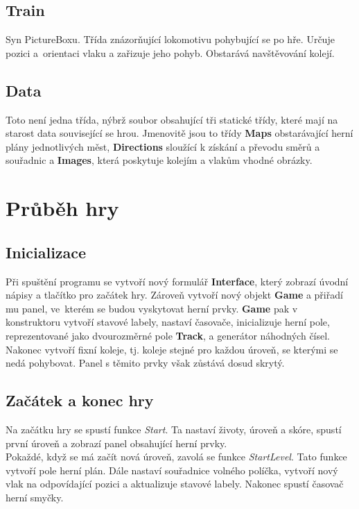 \documentclass[11pt,a4paper]{scrreprt}
\begin{document}
\section{Train}
Syn PictureBoxu. Třída znázorňující lokomotivu pohybující se po hře. Určuje pozici a~orientaci vlaku a zařizuje jeho pohyb. Obstarává navštěvování kolejí.

\section{Data}
Toto není jedna třída, nýbrž soubor obsahující tři statické třídy, které mají na starost data související se hrou. Jmenovitě jsou to třídy \textbf{Maps} obstarávající herní plány jednotlivých měst, \textbf{Directions} sloužící k získání a převodu směrů a souřadnic a \textbf{Images}, která poskytuje kolejím a vlakům vhodné obrázky.

\chapter{Průběh hry}

\section{Inicializace}
Při spuštění programu se vytvoří nový formulář \textbf{Interface}, který zobrazí úvodní nápisy a tlačítko pro začátek hry. Zároveň vytvoří nový objekt \textbf{Game} a přiřadí mu panel, ve~kterém se budou vyskytovat herní prvky. \textbf{Game} pak v konstruktoru vytvoří stavové labely, nastaví časovače, inicializuje herní pole, reprezentované jako dvourozměrné pole \textbf{Track}, a generátor náhodných čísel. Nakonec vytvoří fixní koleje, tj. koleje stejné pro každou úroveň, se kterými se nedá pohybovat. Panel s těmito prvky však zůstává dosud skrytý.

\section{Začátek a konec hry}
Na začátku hry se spustí funkce \textit{Start}. Ta nastaví životy, úroveň a skóre, spustí první úroveň a zobrazí panel obsahující herní prvky.\\

Pokaždé, když se má začít nová úroveň, zavolá se funkce \textit{StartLevel}. Tato funkce vytvoří pole herní plán. Dále nastaví souřadnice volného políčka, vytvoří nový vlak na odpovídající pozici a aktualizuje stavové labely. Nakonec spustí časovač herní smyčky.\\
\end{document}
